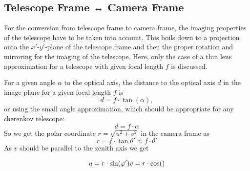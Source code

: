 \documentclass[DIV=15]{scrartcl}
\newcommand\azimuth{\ensuremath{\varphi}}
\newcommand\zenith{\ensuremath{\theta}}
\begin{document}
\subsection{Telescope Frame ↔ Camera Frame}

For the conversion from telescope frame to camera frame, the imaging properties of the telescope have to be taken into account.
This boils down to a projection onto the $x'$-$y'$-plane of the telescope frame and then the proper rotation and mirroring for the imaging of the telescope.
Here, only the case of a thin lens approximation for a telescope with given focal length $f$ is discussed.

For a given angle $\alpha$ to the optical axis, the distance to the optical axis $d$ in the image plane for a given focal length $f$ is
\begin{equation}
  d = f \cdot \tan(\alpha),
\end{equation}
or using the small angle approximation, which should be appropriate
for any cherenkov telescope:
\begin{equation}
  d = f \cdot \alpha
\end{equation}
So we get the polar coordinate $r = \sqrt{u^2 + v^2}$ in the camera frame
as 
\begin{equation}
  r = f \cdot \tan{\zenith'} \approx f \cdot \zenith'
\end{equation}
As $v$ should be parallel to the zenith axis we get

\begin{equation}
  u = r \cdot \sin(\azimuth') \\
  v = r \cdot \cos()
\end{equation}


\printbibliography
\end{document}
